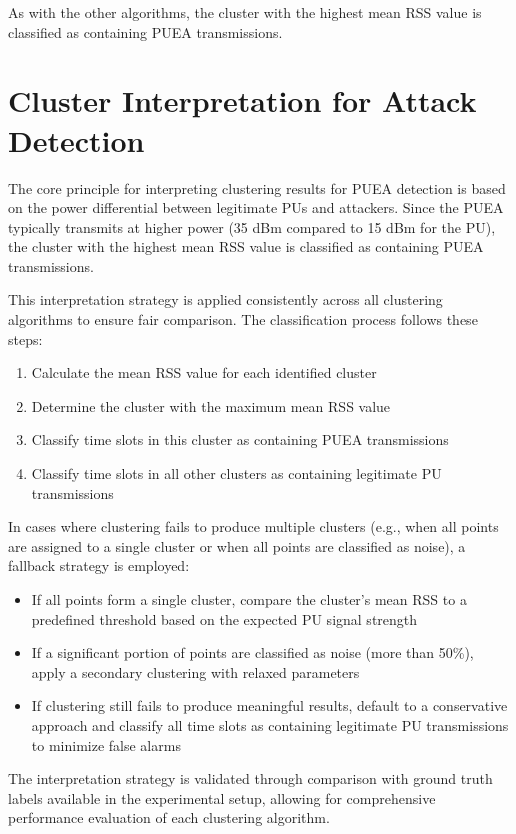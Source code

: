 As with the other algorithms, the cluster with the highest mean RSS value is classified as containing PUEA transmissions.

\section{Cluster Interpretation for Attack Detection}

The core principle for interpreting clustering results for PUEA detection is based on the power differential between legitimate PUs and attackers. Since the PUEA typically transmits at higher power (35 dBm compared to 15 dBm for the PU), the cluster with the highest mean RSS value is classified as containing PUEA transmissions.

This interpretation strategy is applied consistently across all clustering algorithms to ensure fair comparison. The classification process follows these steps:

\begin{enumerate}
    \item Calculate the mean RSS value for each identified cluster
    \item Determine the cluster with the maximum mean RSS value
    \item Classify time slots in this cluster as containing PUEA transmissions
    \item Classify time slots in all other clusters as containing legitimate PU transmissions
\end{enumerate}

In cases where clustering fails to produce multiple clusters (e.g., when all points are assigned to a single cluster or when all points are classified as noise), a fallback strategy is employed:

\begin{itemize}
    \item If all points form a single cluster, compare the cluster's mean RSS to a predefined threshold based on the expected PU signal strength
    \item If a significant portion of points are classified as noise (more than 50\%), apply a secondary clustering with relaxed parameters
    \item If clustering still fails to produce meaningful results, default to a conservative approach and classify all time slots as containing legitimate PU transmissions to minimize false alarms
\end{itemize}

The interpretation strategy is validated through comparison with ground truth labels available in the experimental setup, allowing for comprehensive performance evaluation of each clustering algorithm.
